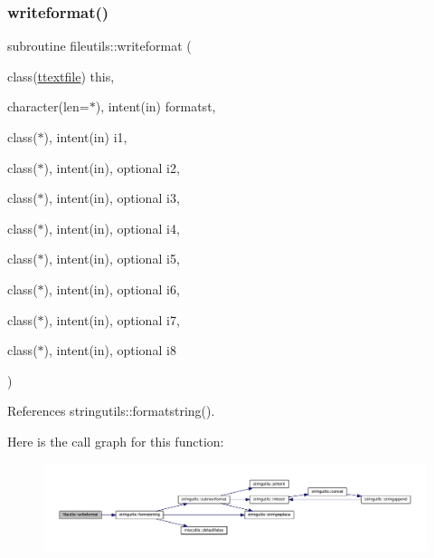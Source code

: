 \subsubsection{\texorpdfstring{writeformat()}{writeformat()}}
{\footnotesize\ttfamily subroutine fileutils\+::writeformat (\begin{DoxyParamCaption}\item[{class(\mbox{\hyperlink{structfileutils_1_1ttextfile}{ttextfile}})}]{this,  }\item[{character(len=$\ast$), intent(in)}]{formatst,  }\item[{class($\ast$), intent(in)}]{i1,  }\item[{class($\ast$), intent(in), optional}]{i2,  }\item[{class($\ast$), intent(in), optional}]{i3,  }\item[{class($\ast$), intent(in), optional}]{i4,  }\item[{class($\ast$), intent(in), optional}]{i5,  }\item[{class($\ast$), intent(in), optional}]{i6,  }\item[{class($\ast$), intent(in), optional}]{i7,  }\item[{class($\ast$), intent(in), optional}]{i8 }\end{DoxyParamCaption})\hspace{0.3cm}{\ttfamily [private]}}



References stringutils\+::formatstring().

Here is the call graph for this function\+:
\nopagebreak
\begin{figure}[H]
\begin{center}
\leavevmode
\includegraphics[width=350pt]{namespacefileutils_a0c8c6f2ca823e9e6d8a31d4002347730_cgraph}
\end{center}
\end{figure}
\mbox{\label{namespacefileutils_a421b7722f368ba1dbf80589c8f944804}} 

